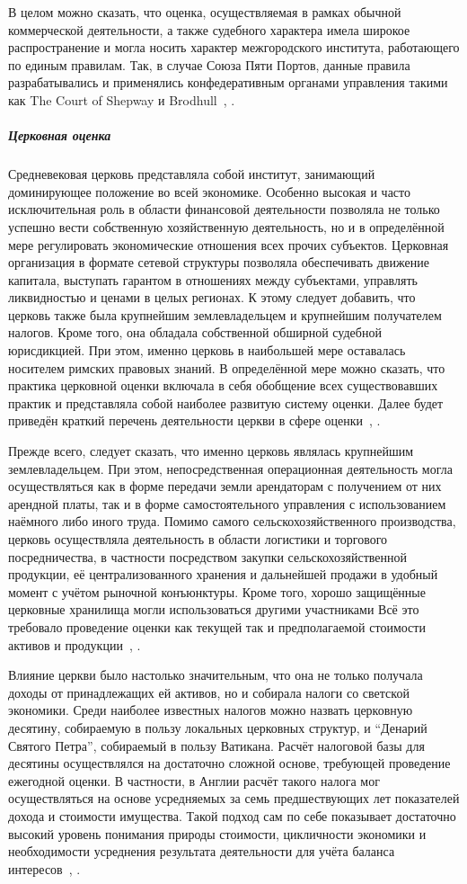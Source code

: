 \documentclass[12pt]{scrartcl}
\begin{document}
В целом можно сказать, что оценка, осуществляемая в рамках обычной коммерческой деятельности, а также судебного характера имела широкое распространение и могла носить характер межгородского института, работающего по единым правилам. Так, в случае Союза Пяти Портов, данные правила разрабатывались и применялись конфедеративным органами управления такими как The Court of Shepway и Brodhull~\cite{Pirenne2014}, \cite{Epstein2001}.
\subparagraph{Церковная оценка}
Средневековая церковь представляла собой институт, занимающий доминирующее положение во всей экономике. Особенно высокая и часто исключительная роль в области финансовой деятельности позволяла не только успешно вести собственную хозяйственную деятельность, но и в определённой мере регулировать экономические отношения всех прочих субъектов. Церковная организация в формате сетевой структуры позволяла обеспечивать движение капитала, выступать гарантом в отношениях между субъектами, управлять ликвидностью и ценами в целых регионах. К этому следует добавить, что церковь также была крупнейшим землевладельцем и крупнейшим получателем налогов. Кроме того, она обладала собственной обширной судебной юрисдикцией. При этом, именно церковь в наибольшей мере оставалась носителем римских правовых знаний. В определённой мере можно сказать, что практика церковной оценки включала в себя обобщение всех существовавших практик и представляла собой наиболее развитую систему оценки. Далее будет приведён краткий перечень деятельности церкви в сфере оценки~\cite{Southern1985}, \cite{Moore2008}.

Прежде всего, следует сказать, что именно церковь являлась крупнейшим землевладельцем. При этом, непосредственная операционная деятельность могла осуществляться как в форме передачи земли арендаторам с получением от них арендной платы, так и в форме самостоятельного управления с использованием наёмного либо иного труда. Помимо самого сельскохозяйственного производства, церковь осуществляла деятельность в области логистики и торгового посредничества, в частности посредством закупки сельскохозяйственной продукции, её централизованного хранения и дальнейшей продажи в удобный момент с учётом рыночной конъюнктуры. Кроме того, хорошо защищённые церковные хранилища могли использоваться другими участниками  Всё это требовало проведение оценки как текущей так и предполагаемой стоимости активов и продукции~\cite{Harvey1996}, \cite{Haverkamp1996}.

Влияние церкви было настолько значительным, что она не только получала доходы от принадлежащих ей активов, но и собирала налоги со светской экономики. Среди наиболее известных налогов можно назвать церковную десятину, собираемую в пользу локальных церковных структур, и ``Денарий Святого Петра'', собираемый в пользу Ватикана. Расчёт налоговой базы для десятины осуществлялся на достаточно сложной основе, требующей проведение ежегодной оценки. В частности, в Англии расчёт такого налога мог осуществляться на основе усредняемых за семь предшествующих лет показателей дохода и стоимости имущества. Такой подход сам по себе показывает достаточно высокий уровень понимания природы стоимости, цикличности экономики и необходимости усреднения результата деятельности для учёта баланса интересов~\cite{Lynch2014}, \cite{Bolton1983}.
\end{document}

